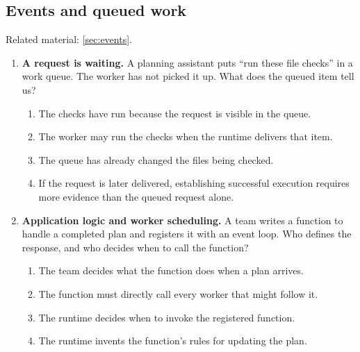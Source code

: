 \begin{enumerate}[start=31,itemsep=0.7\baselineskip]
\end{enumerate}

\subsection{Events and queued work}
\noindent Related material: \cref{sec:events}.

\begin{enumerate}[start=41,itemsep=0.7\baselineskip]
\item\label{exercise:41} \begin{minipage}[t]{\linewidth}
\textbf{A request is waiting.} A planning assistant puts ``run these file checks'' in a work queue. The worker has not picked it up. What does the queued item tell us?
\begin{enumerate}[label=\textnormal{(\Alph*)},leftmargin=*,itemsep=0pt]
\item The checks have run because the request is visible in the queue.
\item The worker may run the checks when the runtime delivers that item.
\item The queue has already changed the files being checked.
\item If the request is later delivered, establishing successful execution requires more evidence than the queued request alone.
\end{enumerate}
\end{minipage}

\item\label{exercise:42} \begin{minipage}[t]{\linewidth}
\textbf{Application logic and worker scheduling.} A team writes a function to handle a completed plan and registers it with an event loop. Who defines the response, and who decides when to call the function?
\begin{enumerate}[label=\textnormal{(\Alph*)},leftmargin=*,itemsep=0pt]
\item The team decides what the function does when a plan arrives.
\item The function must directly call every worker that might follow it.
\item The runtime decides when to invoke the registered function.
\item The runtime invents the function's rules for updating the plan.
\end{enumerate}
\end{minipage}


\end{enumerate}
